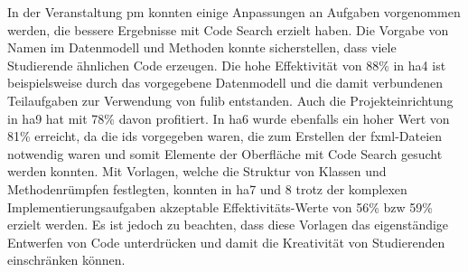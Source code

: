 In der Veranstaltung \ac{pm} konnten einige Anpassungen an Aufgaben vorgenommen werden, die bessere Ergebnisse mit Code Search erzielt haben.
Die Vorgabe von Namen im Datenmodell und Methoden konnte sicherstellen, dass viele Studierende ähnlichen Code erzeugen.
Die hohe Effektivität von 88\% in \ac{ha}4 ist beispielsweise durch das vorgegebene Datenmodell und die damit verbundenen Teilaufgaben zur Verwendung von fulib entstanden.
Auch die Projekteinrichtung in \ac{ha}9 hat mit 78\% davon profitiert.
In \ac{ha}6 wurde ebenfalls ein hoher Wert von 81\% erreicht, da die \acp{id} vorgegeben waren, die zum Erstellen der \ac{fxml}-Dateien notwendig waren und somit Elemente der Oberfläche mit Code Search gesucht werden konnten.
Mit Vorlagen, welche die Struktur von Klassen und Methodenrümpfen festlegten, konnten in \ac{ha}7 und 8 trotz der komplexen Implementierungsaufgaben akzeptable Effektivitäts-Werte von 56\% \ac{bzw} 59\% erzielt werden.
Es ist jedoch zu beachten, dass diese Vorlagen das eigenständige Entwerfen von Code unterdrücken und damit die Kreativität von Studierenden einschränken können.
